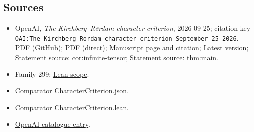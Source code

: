 \documentclass[11pt]{article}
\begin{document}
\subsection{Sources}
\begin{itemize}
\item OpenAI, \emph{The Kirchberg–Rørdam character criterion}, 2026-09-25; citation key \texttt{OAI:The-Kirchberg-Rordam-character-criterion-September-25-2026}. \href{https://github.com/openai/math/blob/adc7f1241b42e322a6451854ab7e4b4c146bf78a/preprints/The-Kirchberg-Rordam-character-criterion-September-25-2026/paper.pdf}{PDF (GitHub)}; \href{https://github.com/openai/math/raw/adc7f1241b42e322a6451854ab7e4b4c146bf78a/preprints/The-Kirchberg-Rordam-character-criterion-September-25-2026/paper.pdf}{PDF (direct)}; \href{https://github.com/openai/math/blob/adc7f1241b42e322a6451854ab7e4b4c146bf78a/preprints/The-Kirchberg-Rordam-character-criterion-September-25-2026/README.md}{Manuscript page and citation}; \href{https://github.com/openai/math/blob/main/preprints/The-Kirchberg-Rordam-character-criterion-September-25-2026/paper.pdf}{Latest version}; Statement source: \href{https://github.com/openai/math/blob/adc7f1241b42e322a6451854ab7e4b4c146bf78a/preprints/The-Kirchberg-Rordam-character-criterion-September-25-2026/build/sections/introduction.tex\#L70}{cor:infinite-tensor}; Statement source: \href{https://github.com/openai/math/blob/adc7f1241b42e322a6451854ab7e4b4c146bf78a/preprints/The-Kirchberg-Rordam-character-criterion-September-25-2026/build/sections/introduction.tex\#L37}{thm:main}.
\item Family 299: \href{https://github.com/openai/math/blob/adc7f1241b42e322a6451854ab7e4b4c146bf78a/lean/docs/299.md}{Lean scope}.
\item \href{https://github.com/openai/math/blob/adc7f1241b42e322a6451854ab7e4b4c146bf78a/lean/ComparatorChallenges/CharacterCriterion.json}{Comparator CharacterCriterion.json}.
\item \href{https://github.com/openai/math/blob/adc7f1241b42e322a6451854ab7e4b4c146bf78a/lean/ComparatorChallenges/CharacterCriterion.lean}{Comparator CharacterCriterion.lean}.
\item \href{https://github.com/openai/math/blob/adc7f1241b42e322a6451854ab7e4b4c146bf78a/CONTENTS.md}{OpenAI catalogue entry}.
\end{itemize}
\end{document}
